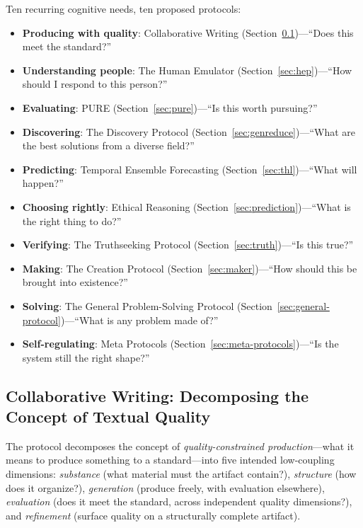 \documentclass[11pt]{article}
\begin{document}
Ten recurring cognitive needs, ten proposed protocols:

\begin{itemize}[leftmargin=1.5em]
\item \textbf{Producing with quality}: Collaborative Writing (Section~\ref{sec:writing})---``Does this meet the standard?''
\item \textbf{Understanding people}: The Human Emulator (Section~\ref{sec:hep})---``How should I respond to this person?''
\item \textbf{Evaluating}: PURE (Section~\ref{sec:pure})---``Is this worth pursuing?''
\item \textbf{Discovering}: The Discovery Protocol (Section~\ref{sec:genreduce})---``What are the best solutions from a diverse field?''
\item \textbf{Predicting}: Temporal Ensemble Forecasting (Section~\ref{sec:thl})---``What will happen?''
\item \textbf{Choosing rightly}: Ethical Reasoning (Section~\ref{sec:prediction})---``What is the right thing to do?''
\item \textbf{Verifying}: The Truthseeking Protocol (Section~\ref{sec:truth})---``Is this true?''
\item \textbf{Making}: The Creation Protocol (Section~\ref{sec:maker})---``How should this be brought into existence?''
\item \textbf{Solving}: The General Problem-Solving Protocol (Section~\ref{sec:general-protocol})---``What is any problem made of?''
\item \textbf{Self-regulating}: Meta Protocols (Section~\ref{sec:meta-protocols})---``Is the system still the right shape?''
\end{itemize}

\subsection{Collaborative Writing: Decomposing the Concept of Textual Quality}
\label{sec:writing}

The protocol decomposes the concept of \emph{quality-constrained production}---what it means to produce something to a standard---into five intended low-coupling dimensions: \emph{substance} (what material must the artifact contain?), \emph{structure} (how does it organize?), \emph{generation} (produce freely, with evaluation elsewhere), \emph{evaluation} (does it meet the standard, across independent quality dimensions?), and \emph{refinement} (surface quality on a structurally complete artifact).
\end{document}

